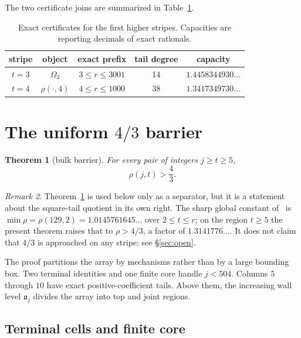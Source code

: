 \documentclass[11pt,a4paper]{article}
\theoremstyle{plain}
\newtheorem{theorem}{Theorem}[section]
\theoremstyle{remark}
\newtheorem{remark}[theorem]{Remark}
\newcommand{\level}{\mathfrak a}
\begin{document}
The two certificate joins are summarized in Table~\ref{tab:first}.
\begin{table}[ht]
\centering
\caption{Exact certificates for the first higher stripes.  Capacities are
reporting decimals of exact rationals.}\label{tab:first}
\begin{tabular}{@{}ccccc@{}}
\toprule
stripe & object & exact prefix & tail degree & capacity\\
\midrule
$t=3$ & $\Omega_3$ & $3\le r\le3001$ & 14 & $1.4458344930\ldots$\\
$t=4$ & $\rho(\cdot,4)$ & $4\le r\le1000$ & 38 & $1.3417349730\ldots$\\
\bottomrule
\end{tabular}
\end{table}

\section{The uniform \texorpdfstring{$4/3$}{4/3} barrier}\label{sec:bulk}

\begin{theorem}[bulk barrier]\label{thm:bulk}
For every pair of integers $j\ge t\ge5$,
\begin{equation}\label{eq:bulk}
 \rho(j,t)>\frac43.
\end{equation}
\end{theorem}

\begin{remark}
Theorem~\ref{thm:bulk} is used below only as a separator, but it is a
statement about the square-tail quotient in its own right.  The sharp global
constant of~\cite{squaretail} is $\min\rho=\rho(129,2)=1.0145761645\ldots$
over $2\le t\le r$; on the region $t\ge5$ the present theorem raises that to
$\rho>4/3$, a factor of $1.3141776\ldots$.  It does not claim that $4/3$ is
approached on any stripe; see \S\ref{sec:open}.
\end{remark}

The proof partitions the array by mechanisms rather than by a large bounding
box.  Two terminal identities and one finite core handle $j<504$.  Columns
$5$ through $10$ have exact positive-coefficient tails.  Above them, the
increasing wall level $\level_j$ divides the array into top and joint regions.

\subsection{Terminal cells and finite core}
\end{document}
